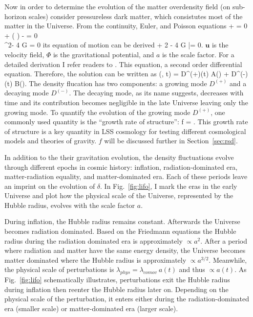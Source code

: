 Now in order to determine the evolution of the matter overdensity field
(on sub-horizon scales) consider pressureless dark matter, which consistutes 
most of the matter in the Universe. From the continuity, Euler, and Poisson equations
\beqa 
{} + \nabla \dot \rho {} = 0  \\ 
 + ( \cdot \nabla) \cdot {} - \nabla\Phi = 0 \\ 
\nabla^2\Phi - 4 \pi G \rho = 0 
\eeqa
its equation of motion can be derived
\beq \label{eq:meszaros}
 + 2   - 4 \pi G \bar{\rho}\;\delta = 0.
\eeq
$\bm{u}$ is the velocity field, $\Phi$ is the gravitational potential, and $a$ 
is the scale factor. For a detailed derivation I refer readers to 
\cite{peebles80, DodelsonBook}. This equation, a second order differential 
equation. Therefore, the solution can be written as 
\beq 
\delta(, t) = D^{(+)}(t) A() + D^{(-)}(t) B().
\eeq
The density flucation has two components: a growing mode $D^{(+)}$ and a decaying 
mode $D^{(-)}$. The decaying mode, as its name suggests, decreases with time 
and its contribution becomes negligible in the late Universe leaving only the 
growing mode. To quantify the evolution of the growing mode $D^{(+)}$, one 
commonly used quantity is the ``growth rate of structure'': 
\beq \label{eq:f_growth}
f = . 
\eeq
This growth rate of structure is a key quantity in LSS cosmology for testing different 
cosmological models and theories of gravity. $f$ will be discussed further in 
Section~\ref{sec:rsd}.

In addition to the their gravitation evolution, the density fluctuations 
evolve through different epochs in cosmic history: inflation, 
radiation-dominated era, matter-radiation equality, and matter-dominated era. Each of 
these periods leave an imprint on the evolution of $\delta$. In Fig.~\ref{fig:lifo}, 
I mark the eras in the early Universe and plot how the physical scale of 
the Universe, represented by the Hubble radius, evolves with the scale factor $a$. 

During inflation, the Hubble radius remains constant. Afterwards the Universe 
becomes radiation dominated. Based on the Friedmann equations the Hubble radius 
during the radiation dominated era is approximately $\propto a^{2}$. After a period 
where radiation and matter have the same energy density, the Universe 
becomes matter dominated where the Hubble radius is approximately $\propto a^{3/2}$. 
Meanwhile, the physical scale of perturbations is $\lambda_{phys} = \lambda_{comov}\ a(t)$ 
and thus $\propto a(t)$. As Fig.~\ref{fig:lifo} schematically illustrates, 
perturbations exit the Hubble radius during inflation then 
reenter the Hubble radius later on. 
Depending on the physical scale of the perturbation, it enters either
during the radiation-dominated era (smaller scale) or matter-dominated era (larger scale). 

